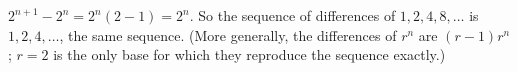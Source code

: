$2^{n+1}-2^n=2^n(2-1)=2^n$. So the sequence of differences of $1,2,4,8,\dots$ is $1,2,4,\dots$, the same sequence. (More generally, the differences of $r^n$ are $(r-1)r^n$; $r=2$ is the only base for which they reproduce the sequence exactly.)

